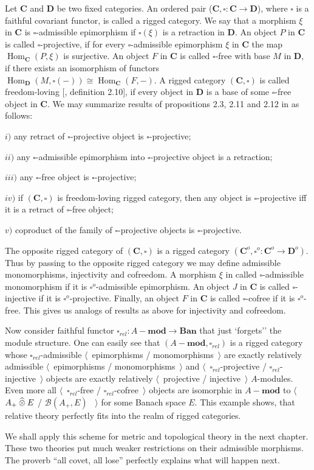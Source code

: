 Let $\mathbf{C}$ and $\mathbf{D}$ be two fixed categories. An ordered pair ($\mathbf{C}, \square:\mathbf{C}\to\mathbf{D}$), where $\square$ is a faithful covariant functor, is called a rigged category. We say that a morphism $\xi$ in $\mathbf{C}$ is $\square$-admissible epimorphism if $\square (\xi)$ is a retraction in $\mathbf{D}$. An object $P$ in $\mathbf{C}$ is called $\square$-projective, if for every $\square$-admissible epimorphism $\xi$ in $\mathbf{C}$ the map $\operatorname{Hom}_{\mathbf{C}}(P,\xi)$ is surjective. An object $F$ in $\mathbf{C}$ is called $\square$-free with base $M$ in  $\mathbf{D}$, if there exists an isomorphism of functors $\operatorname{Hom}_{\mathbf{D}}(M,\square(-))\cong\operatorname{Hom}_{\mathbf{C}}(F,-)$. A rigged category $(\mathbf{C},\square)$ is called  freedom-loving [\cite{HelMetrFrQMod}, definition 2.10], if every object in $\mathbf{D}$ is a base of some $\square$-free object in $\mathbf{C}$. We may summarize results of propositions 2.3, 2.11  and 2.12 in \cite{HelMetrFrQMod} as follows:

$i)$ any retract of $\square$-projective object is $\square$-projective;

$ii)$ any $\square$-admissible epimorphism into $\square$-projective object is a retraction;

$iii)$ any $\square$-free object is $\square$-projective;

$iv)$ if $(\mathbf{C},\square)$ is freedom-loving rigged category, then any object is $\square$-projective iff it is a retract of $\square$-free object;

$v)$ coproduct of the family of $\square$-projective objects is $\square$-projective.

The opposite rigged category of $(\mathbf{C}, \square)$ 
is a rigged category $(\mathbf{C}^{o},\square^{o}:\mathbf{C}^{o}\to\mathbf{D}^{o})$. 
Thus by passing to the opposite rigged category we may define admissible monomorphisms, injectivity and cofreedom. A morphism $\xi$ in called $\square$-admissible monomorphism if it is $\square^o$-admissible epimorphism. An object $J$ in $\mathbf{C}$ is called $\square$-injective if it is $\square^o$-projective. Finally, an object $F$ in $\mathbf{C}$ is called $\square$-cofree if it is $\square^o$-free. This gives us analogs of results as above for injectivity and cofreedom.

Now consider faithful functor $\square_{rel}:A-\mathbf{mod}\to\mathbf{Ban}$ that just `forgets'' the module structure. One can easily see that $(A-\mathbf{mod},\square_{rel})$ is a rigged category whose $\square_{rel}$-admissible $\langle$~epimorphisms / monomorphisms~$\rangle$ are exactly relatively admissible $\langle$~epimorphisms / monomorphisms~$\rangle$ and $\langle$~$\square_{rel}$-projective / $\square_{rel}$-injective~$\rangle$ objects are exactly relatively $\langle$~projective / injective~$\rangle$ $A$-modules. Even more all $\langle$~$\square_{rel}$-free / $\square_{rel}$-cofree~$\rangle$ objects are isomorphic in $A-\mathbf{mod}$ to $\langle$~$A_+\mathbin{\widehat{\otimes}} E$ / $\mathcal{B}(A_+,E)$ ~$\rangle$ for some Banach space $E$. This example shows, that relative theory perfectly fits into the realm of rigged categories.

We shall apply this scheme for metric and topological theory in the next chapter. These two theories put much weaker restrictions on their admissible morphisms. The proverb ``all covet, all lose'' perfectly explains what will happen next.
